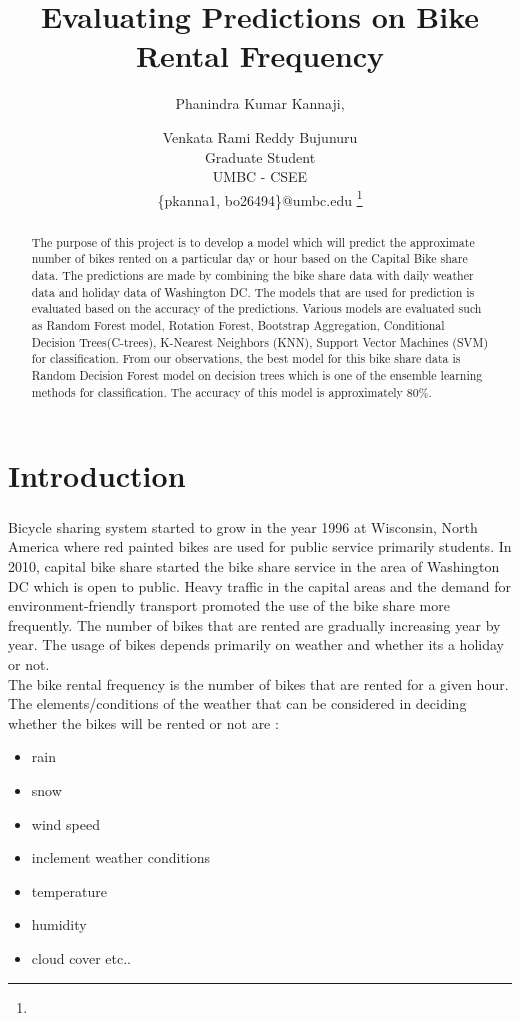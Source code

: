 \documentclass[journal, a4paper]{IEEEtran}
\begin{document}
\title{Evaluating Predictions on Bike Rental Frequency}
    \author{
    Phanindra Kumar Kannaji,
\and
Venkata Rami Reddy Bujunuru\\
Graduate Student\\
UMBC - CSEE\\
\{pkanna1, bo26494\}@umbc.edu
    \thanks{}}
    \markboth{}{}
    \maketitle

\begin{abstract}
    The purpose of this project is to develop a model which will predict the approximate number of bikes rented on a particular day or hour based on the Capital Bike share data. The predictions are made by combining the bike share data with daily weather data and holiday data of Washington DC. The models that are used for prediction is evaluated based on the accuracy of the predictions. Various models are evaluated such as Random Forest model, Rotation Forest, Bootstrap Aggregation, Conditional Decision Trees(C-trees), K-Nearest Neighbors (KNN), Support Vector Machines (SVM) for classification. From our observations, the best model for this bike share data is Random Decision Forest model on decision trees which is one of the ensemble learning methods for classification. The accuracy of this model is approximately 80\%.
\end{abstract}
\setlength{\parindent}{7ex}
\section{Introduction}
    Bicycle sharing system\textsuperscript{\cite{bikesharewiki}} started to grow in the year 1996 at Wisconsin, North America where red painted bikes are used for public service primarily students. In 2010, capital bike share started the bike share service in the area of Washington DC which is open to public. Heavy traffic in the capital areas and the demand for environment-friendly transport promoted the use of the bike share more frequently. The number of bikes that are rented are gradually increasing year by year. The usage of bikes depends primarily on weather and whether its a holiday or not.\\
    \indent The bike rental frequency is the number of bikes that are rented for a given hour. The elements/conditions of the weather that can be considered in deciding whether the bikes will be rented or not are :
    \begin{itemize}
    \item rain
    \item snow
    \item wind speed
    \item inclement weather conditions
    \item temperature
    \item humidity
    \item cloud cover etc..
    \end{itemize}
    
\end{document}
